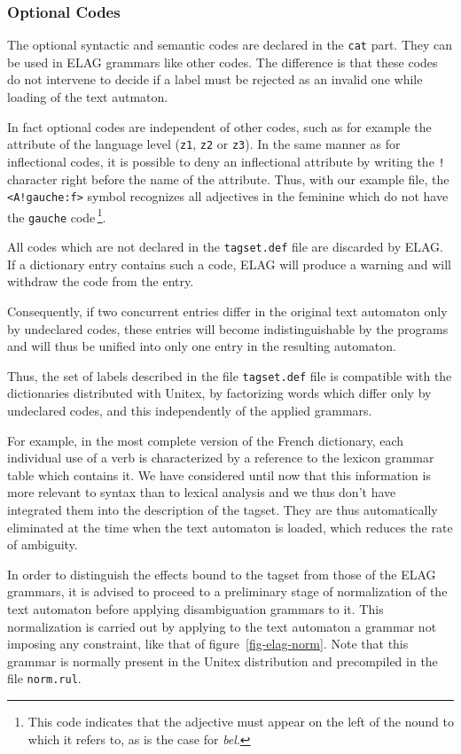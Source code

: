 \subsubsection{Optional Codes}
The optional syntactic and semantic codes are declared in the \verb$cat$ part.
They can be used in ELAG grammars like other codes. The difference is that these
codes do not intervene to decide if a label must be rejected as an invalid one
while loading of the text autmaton.

\bigskip
\noindent In fact optional codes are independent of other codes, such as for example the
attribute of the language level (\verb$z1$, \verb$z2$ or \verb$z3$). In the same
manner as for inflectional codes, it is possible to deny an inflectional
attribute by writing the \verb$!$ character right before the name of the
attribute. Thus, with our example file, the \verb$<A!gauche:f>$ symbol recognizes
all adjectives in the feminine which do not have the \verb$gauche$
code\,\footnote{This code indicates that the adjective must appear on the left of
the nound to which it refers to, as is the case for \textit{bel}.}.

\bigskip
\noindent All codes which are not declared in the
\verb$tagset.def$ file are discarded by ELAG. If a
dictionary entry contains such a code, ELAG will produce a warning and will
withdraw the code from the entry.

\bigskip
\noindent Consequently, if two concurrent entries differ in the original text automaton
only by undeclared codes, these entries will become indistinguishable by the
programs and will thus be unified into only one entry in the resulting automaton.

\bigskip
\noindent Thus, the set of labels described in the file \verb$tagset.def$ file is
compatible with the dictionaries distributed with Unitex, by factorizing words
which differ only by undeclared codes, and this independently of the applied
grammars.

\bigskip
\noindent For example, in the most complete version of the French dictionary, each
individual use of a verb is characterized by a reference to the lexicon grammar
table which contains it. We have considered until now that this information is
more relevant to syntax than to lexical analysis and we thus don't have
integrated them into the description of the tagset. They are thus automatically
eliminated at the time when the text automaton is loaded, which reduces the rate
of ambiguity.

\bigskip
\noindent In order to distinguish the effects bound to the tagset from those of the ELAG
grammars, it is advised to proceed to a preliminary stage of normalization of the
text automaton before applying disambiguation grammars to it. This normalization
is carried out by applying to the text automaton a grammar not imposing any
constraint, like that of figure~\ref{fig-elag-norm}. Note that this grammar is
normally present in the Unitex distribution and precompiled in the file
\verb+norm.rul+.

